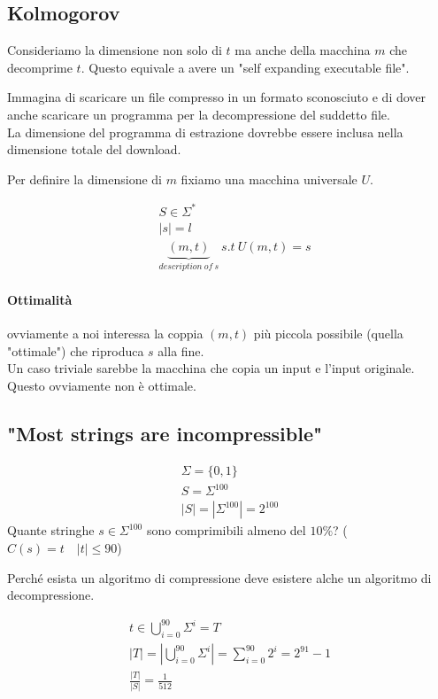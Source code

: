 \documentclass{article}
\begin{document}
\subsection{Kolmogorov}
Consideriamo la dimensione non solo di $t$ ma anche della macchina $m$ che decomprime $t$. Questo equivale a avere un "self expanding executable file".

\begin{callout}{}
    Immagina di scaricare un file compresso in un formato sconosciuto e di dover anche scaricare un programma per la decompressione del suddetto file. \\ La dimensione del programma di estrazione dovrebbe essere inclusa nella dimensione totale del download.
\end{callout}

Per definire la dimensione di $m$ fixiamo una macchina universale $U$.

\begin{align*}
    & S\in\Sigma^* \\
    & |s| = l \\
    & \underbrace{(m,t)}_{description\ of\ s}\ s.t\ U(m,t)=s
\end{align*}

\paragraph{Ottimalità} ovviamente a noi interessa la coppia $(m,t)$ più piccola possibile (quella "ottimale") che riproduca $s$ alla fine. \\
Un caso triviale sarebbe la macchina che copia un input e l'input originale. Questo ovviamente non è ottimale.

\subsection{"Most strings are incompressible"}
\begin{gather*}
    \Sigma=\{0,1\} \\
    S = \Sigma^{100} \\
    |S| = |\Sigma^{100}| = 2^{100}
\end{gather*}
Quante stringhe $s\in\Sigma^{100}$ sono comprimibili almeno del $10\%$? ($C(s)=t\quad |t|\leq 90$)

Perché esista un algoritmo di compressione deve esistere alche un algoritmo di decompressione. 

\begin{gather*}
    t\in\bigcup_{i=0}^{90}\Sigma^i = T \\
    |T| = \left|\bigcup_{i=0}^{90}\Sigma^i\right| = \sum_{i=0}^{90} 2^i = 2^{91}-1 \\
    \frac{|T|}{|S|} = \frac{1}{512}
\end{gather*}
\end{document}
